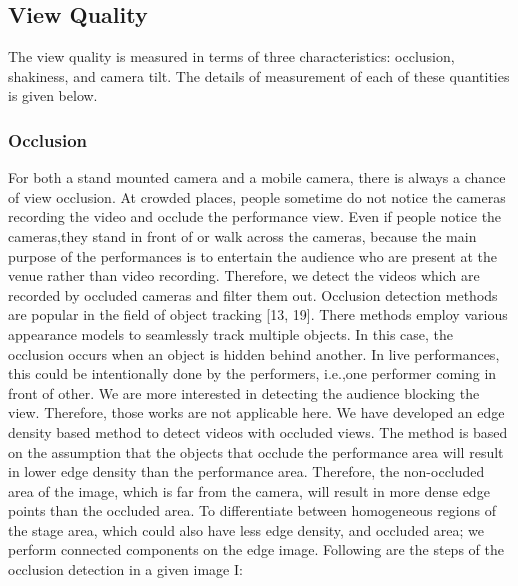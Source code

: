 \documentclass{sig-alternate}
\begin{document}
\subsection{View Quality}
The view quality is measured in terms of three characteristics:
occlusion, shakiness, and camera tilt. The details of measurement
of each of these quantities is given below.
\subsubsection{Occlusion}
For both a stand mounted camera and a mobile camera, there is always a chance of view occlusion. At crowded places, people sometime do not notice the cameras recording the video and occlude the performance view. Even if people notice the cameras,they stand in front of or walk across the cameras, because the main purpose of the performances is to entertain the audience who are present at the venue rather than video recording. Therefore, we detect the videos which are recorded by occluded cameras and filter them out.
Occlusion detection methods are popular in the field of object tracking [13, 19]. There methods employ various appearance models to seamlessly track multiple objects. In this case, the occlusion occurs when an object is hidden behind another. In live performances, this could be intentionally done by the performers, i.e.,one performer coming in front of other. We are more interested in detecting the audience blocking the view. Therefore, those works are not applicable here.
We have developed an edge density based method to detect videos with occluded views. The method is based on the assumption that the objects that occlude the performance area will result in lower edge density than the performance area. Therefore, the non-occluded area of the image, which is far from the camera, will result in more dense edge points than the occluded area. To differentiate between homogeneous regions of the stage area, which could also have less edge density, and occluded area; we perform connected components on the edge image. Following are the steps of the occlusion detection in a given image I:
\end{document}
